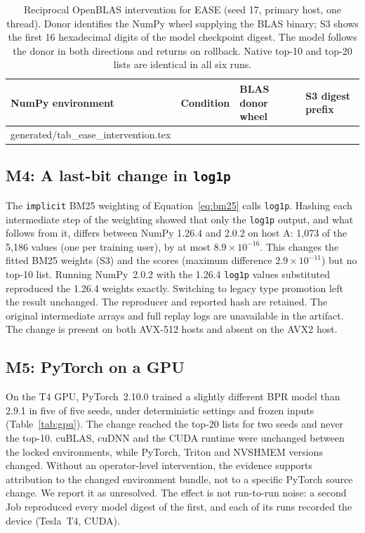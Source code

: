 \documentclass[11pt,a4paper]{article}
\makeatletter
\newcommand{\tablebody}[1]{\@@input generated/#1.tex }
\makeatother
\begin{document}
\begin{table}[htbp]
  \centering\small
  \caption{Reciprocal OpenBLAS intervention for EASE (seed 17, primary host,
    one thread). Donor identifies the NumPy wheel supplying the BLAS binary;
    S3 shows the first 16 hexadecimal digits of the model checkpoint digest.
    The model follows the donor in both directions and returns on rollback.
    Native top-10 and top-20 lists are identical in all six runs.}
  \label{tab:ease}
  \begin{tabular}{@{}llll@{}}
    \toprule
    NumPy environment & Condition & BLAS donor wheel & S3 digest prefix \\
    \midrule
    \tablebody{tab_ease_intervention}
    \bottomrule
  \end{tabular}
\end{table}

\subsection{M4: A last-bit change in \texttt{log1p}}

The \texttt{implicit} BM25 weighting of Equation~\eqref{eq:bm25} calls
\texttt{log1p}. %
Hashing each intermediate step of the weighting showed that only the
\texttt{log1p} output, and what follows from it, differs between NumPy 1.26.4
and 2.0.2 on host A: 1{,}073 of the 5{,}186 values (one per training user), by
at most $8.9\times10^{-16}$. This changes the fitted BM25 weights (S3) and the
scores (maximum difference $2.9\times10^{-11}$) but no top-10 list. Running
NumPy~2.0.2 with the 1.26.4 \texttt{log1p} values substituted reproduced the
1.26.4 weights exactly. Switching to legacy type promotion left the result
unchanged. The reproducer and reported hash are retained. The original
intermediate arrays and full replay logs are unavailable in the artifact.
The change is present on both AVX-512 hosts and absent on the AVX2 host.

\subsection{M5: PyTorch on a GPU}

On the T4 GPU, PyTorch~2.10.0 trained a slightly different BPR model than
2.9.1 in five of five seeds, under deterministic settings and frozen inputs
(Table~\ref{tab:gpu}). The change reached the top-20 lists for two seeds and
never the top-10. cuBLAS, cuDNN and the CUDA runtime were unchanged between
the locked environments, while PyTorch, Triton and NVSHMEM versions changed.
Without an operator-level intervention, the evidence supports attribution to
the changed environment bundle, not to a specific PyTorch source change. We
report it as unresolved. The effect is not run-to-run noise: a second Job
reproduced every model digest of the first, and each of its
\rerunGpuDeviceRuns{} runs recorded the device (Tesla~T4, CUDA).
\end{document}

